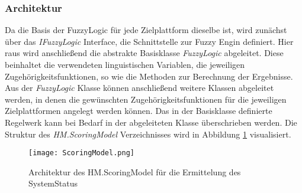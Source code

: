 \subsubsection*{Architektur}
Da die Basis der FuzzyLogic für jede Zielplattform dieselbe ist, wird zunächst über das \textit{IFuzzyLogic} Interface, die Schnittstelle zur Fuzzy Engin definiert. Hier raus wird anschließend die abstrakte Basisklasse \textit{FuzzyLogic} abgeleitet. Diese beinhaltet die verwendeten linguistischen Variablen, die jeweiligen Zugehörigkeitsfunktionen, so wie die Methoden zur Berechnung der Ergebnisse.\\
Aus der \textit{FuzzyLogic} Klasse können anschließend weitere Klassen abgeleitet werden, in denen die gewünschten Zugehörigkeitsfunktionen für die jeweiligen Zielplattformen angelegt werden können. Das in der Basisklasse definierte Regelwerk kann bei Bedarf in der abgeleiteten Klasse überschrieben werden. Die Struktur des \textit{HM.ScoringModel} Verzeichnisses wird in Abbildung \ref{fig:ScoringModel} visualisiert.  
\begin{center}
    \begin{figure}[h!]
        \captionsetup{justification=centering,format=plain, font=small}
        \centering
        \texttt{[image: ScoringModel.png]}
        \caption{Architektur des HM.ScoringModel für die Ermittelung des SystemStatus}
        \label{fig:ScoringModel}
    \end{figure}
\end{center}

